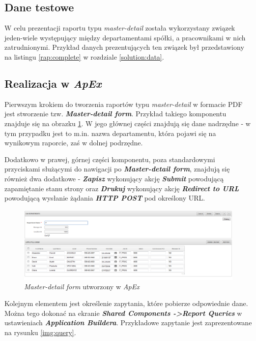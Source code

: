 \documentclass[11pt,a4paper]{article}
\begin{document}
\subsection{Dane testowe} \label{test:data}
W celu prezentacji raportu typu \emph{master-detail} została wykorzystany związek jeden-wiele występujący między departamentami spółki, a pracownikami w nich zatrudnionymi. Przykład danych prezentujących ten związek był przedstawiony na listingu \ref{rap:complete} w rozdziale \ref{solution:data}.


\subsection{Realizacja w \emph{ApEx}} \label{test:apex}
Pierwszym krokiem do tworzenia raportów typu \emph{master-detail} w formacie PDF jest stworzenie tzw. \textbf{\emph{Master-detail form}}. Przykład takiego komponentu znajduje się na obrazku \ref{img:master-detail-form}. W jego głównej części znajdują się dane nadrzędne - w tym przypadku jest to m.in. nazwa departamentu, która pojawi się na wynikowym raporcie, zaś w dolnej podrzędne. 

Dodatkowo w prawej, górnej części komponentu, poza standardowymi przyciskami służącymi do nawigacji po \textbf{\emph{Master-detail form}}, znajdują się również dwa dodatkowe - \textbf{\emph{Zapisz}} wykonujący akcję \textbf{\emph{Submit}} powodującą zapamiętanie stanu strony oraz \textbf{\emph{Drukuj}} wykonujący akcję \textbf{\emph{Redirect to URL}} powodującą wysłanie żądania \textbf{\emph{HTTP POST}} pod określony URL.

\begin{figure}[h]
\centering
\includegraphics[scale=0.4]{master-detail-form}
\caption{\emph{Master-detail form} utworzony w \emph{ApEx}}
\label{img:master-detail-form}
\end{figure}

Kolejnym elementem jest określenie zapytania, które pobierze odpowiednie dane. Można tego dokonać na ekranie \textbf{\emph{Shared Components -\textgreater Report Queries}} w ustawieniach \textbf{\emph{Application Buildera}}. Przykładowe zapytanie jest zaprezentowane na rysunku \ref{img:query}. 
\end{document}
